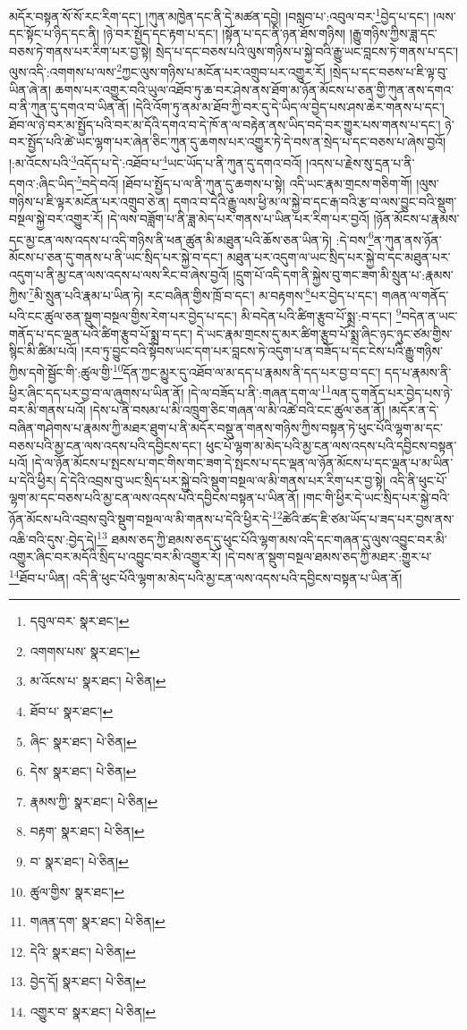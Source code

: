མདོར་བསྟན་སོ་སོ་རང་རིག་དང་། །ཀུན་མཁྱེན་དང་ནི་དེ་མཚན་དབྱེ། །བསླབ་པ་:འབུལ་བར་\footnote{དབུལ་བར་  སྣར་ཐང་། }བྱེད་པ་དང་། །ལས་དང་སྟོང་པ་ཉིད་དང་ནི། །ཉེ་བར་སྤྱོད་དང་རྟག་པ་དང་། །སྟོན་པ་དང་ནི་ཉན་ཐོས་གཉིས། །རྒྱུ་གཉིས་ཀྱིས་ཟླ་དང་བཅས་ཏེ་གནས་པར་རིག་པར་བྱ་སྟེ། སྲེད་པ་དང་བཅས་པའི་ལུས་གཉིས་པ་སྐྱེ་བའི་རྒྱུ་ཡང་བླངས་ཏེ་གནས་པ་དང་། ལུས་འདི་:འགགས་པ་ལས་\footnote{འགགས་པས་  སྣར་ཐང་། }ཀྱང་ལུས་གཉིས་པ་མངོན་པར་འགྲུབ་པར་འགྱུར་རོ། །སྲེད་པ་དང་བཅས་པ་ཇི་ལྟ་བུ་ཡིན་ཞེ་ན། ཆགས་པར་འགྱུར་བའི་ཡུལ་འཐོབ་ཏུ་ཆ་བར་ཤེས་ནས་ཐོག་མ་ཉོན་མོངས་པ་ཅན་གྱི་ཀུན་ནས་དགའ་བ་ནི་ཀུན་དུ་དགའ་བ་ཡིན་ནོ། །དེའི་འོག་ཏུ་ནམ་མ་ཐོབ་ཀྱི་བར་དུ་དེ་ཡིད་ལ་བྱེད་པས་ཤས་ཆེར་གནས་པ་དང་། ཐོབ་ལ་ཉེ་བར་མ་སྤྱོད་པའི་བར་མ་དོའི་དགའ་བ་དེ་ཁོ་ན་ལ་བརྟེན་ནས་ཡིད་བདེ་བར་གྱུར་པས་གནས་པ་དང་། ཉེ་བར་སྤྱོད་པའི་ཚེ་ཡང་ལྷག་པར་ཞེན་ཅིང་ཀུན་དུ་ཆགས་པར་འགྱུར་ཏེ་དེ་བས་ན་སྲེད་པ་དང་བཅས་པ་ཞེས་བྱའོ། །:མ་འོངས་པའི་\footnote{མ་འོངས་པ་  སྣར་ཐང་།  པེ་ཅིན། }འདོད་པ་དེ་:འཐོབ་པ་\footnote{ཐོབ་པ་  སྣར་ཐང་། }ཡང་ཡོད་པ་ནི་ཀུན་དུ་དགའ་བའོ། །འདས་པ་རྗེས་སུ་དྲན་པ་ནི་དགའ་:ཞིང་ཡིད་\footnote{ཞིང་  སྣར་ཐང་།  པེ་ཅིན། }བདེ་བའོ། །ཐོབ་པ་སྤྱོད་པ་ལ་ནི་ཀུན་དུ་ཆགས་པ་སྟེ། འདི་ཡང་རྣམ་གྲངས་གཅིག་གོ། །ལུས་གཉིས་པ་ཇི་ལྟར་མངོན་པར་འགྲུབ་ཅེ་ན། དགའ་བ་དེའི་རྒྱུ་ལས་ཕྱི་མ་ལ་སྐྱེ་བ་དང་རྒ་བའི་རྩ་བ་ལས་བྱུང་བའི་སྡུག་བསྔལ་སྐྱེ་བར་འགྱུར་རོ། །དེ་ལས་བཟློག་པ་ནི་ཟླ་མེད་པར་གནས་པ་ཡིན་པར་རིག་པར་བྱའོ། །ཉོན་མོངས་པ་རྣམས་དང་མྱ་ངན་ལས་འདས་པ་འདི་གཉིས་ནི་ཕན་ཚུན་མི་མཐུན་པའི་ཆོས་ཅན་ཡིན་ཏེ། :དེ་བས་\footnote{དེས་  སྣར་ཐང་།  པེ་ཅིན། }ན་ཀུན་ནས་ཉོན་མོངས་པ་ཅན་དུ་གནས་པ་ནི་ཡང་སྲིད་པར་སྐྱེ་བ་དང་། མཐུན་པར་འདུག་ལ་ཡང་སྲིད་པར་སྐྱེ་བ་དང་མཐུན་པར་འདུག་པ་ནི་མྱ་ངན་ལས་འདས་པ་ལས་རིང་བ་ཞེས་བྱའོ། །དྲུག་པོ་འདི་དག་ནི་སྐྱེས་བུ་གང་ཟག་མི་སྲུན་པ་:རྣམས་ཀྱིས་\footnote{རྣམས་ཀྱི་  སྣར་ཐང་།  པེ་ཅིན། }མི་སྲུན་པའི་རྣམ་པ་ཡིན་ཏེ། རང་བཞིན་གྱིས་ཁྲོ་བ་དང་། མ་བརྟགས་\footnote{བརྟག་  སྣར་ཐང་།  པེ་ཅིན། }པར་བྱེད་པ་དང་། གཞན་ལ་གནོད་པའི་ངང་ཚུལ་ཅན་སྡུག་བསྔལ་གྱིས་རེག་པར་བྱེད་པ་དང་། མི་བདེན་པའི་ཚིག་རྩུབ་པོ་སྨྲ་:བ་དང་། \footnote{བ་  སྣར་ཐང་།  པེ་ཅིན། }བདེན་ན་ཡང་གནོད་པ་དང་ལྡན་པའི་ཚིག་རྩུབ་པོ་སྨྲ་བ་དང་། དེ་ཡང་རྣམ་གྲངས་དུ་མར་ཚིག་རྩུབ་པོ་སྨྲ་ཞིང་ཉང་ཉུང་ཙམ་གྱིས་སྙིང་མི་ཚིམ་པའོ། །རབ་ཏུ་བྱུང་བའི་སྟོབས་ཡང་དག་པར་བླངས་ཏེ་འདུག་པ་ན་བཟོད་པ་དང་ངེས་པའི་རྒྱུ་གཉིས་ཀྱིས་དགེ་སྦྱོང་གི་:ཚུལ་གྱི་\footnote{ཚུལ་གྱིས་  སྣར་ཐང་། }དོན་ཀྱང་མྱུར་དུ་འཐོབ་ལ་མ་དད་པ་རྣམས་ནི་དད་པར་བྱ་བ་དང་། དད་པ་རྣམས་ནི་ཕྱིར་ཞིང་དད་པར་བྱ་བ་ལ་ཞུགས་པ་ཡིན་ནོ། །དེ་ལ་བཟོད་པ་ནི་:གཞན་དག་ལ་\footnote{གཞན་དག་  སྣར་ཐང་།  པེ་ཅིན། }ལན་དུ་གནོད་པར་བྱེད་པས་ཉེ་བར་མི་གནས་པའོ། །དེས་པ་ནི་བསམ་པ་མི་འཁྲུག་ཅིང་གཞན་ལ་མི་འཚེ་བའི་ངང་ཚུལ་ཅན་ནོ། །མདོར་ན་དེ་བཞིན་གཤེགས་པ་རྣམས་ཀྱི་མཐར་ཐུག་པ་ནི་མདོར་བསྡུ་ན་གནས་གཉིས་ཀྱིས་བསྟན་ཏེ་ཕུང་པོའི་ལྷག་མ་དང་བཅས་པའི་མྱ་ངན་ལས་འདས་པའི་དབྱིངས་དང་། ཕུང་པོ་ལྷག་མ་མེད་པའི་མྱ་ངན་ལས་འདས་པའི་དབྱིངས་བསྟན་པའོ། །དེ་ལ་ཉོན་མོངས་པ་སྤངས་པ་གང་གིས་གང་ཟག་དེ་སྤངས་པ་དང་ལྡན་ལ་ཉོན་མོངས་པ་དང་ལྡན་པ་མ་ཡིན་པ་དེའི་ཕྱིར། དེ་དེའི་འབྲས་བུ་ཡང་སྲིད་པར་སྐྱེ་བའི་སྡུག་བསྔལ་ལ་མི་གནས་པར་རིག་པར་བྱ་སྟེ། འདི་ནི་ཕུང་པོ་ལྷག་མ་དང་བཅས་པའི་མྱ་ངན་ལས་འདས་པའི་དབྱིངས་བསྟན་པ་ཡིན་ནོ། །གང་གི་ཕྱིར་དེ་ཡང་སྲིད་པར་སྐྱེ་བའི་ཉོན་མོངས་པའི་འབྲས་བུའི་སྡུག་བསྔལ་ལ་མི་གནས་པ་དེའི་ཕྱིར་དེ་\footnote{དེའི་  སྣར་ཐང་།  པེ་ཅིན། }ཚེའི་ཚད་ཇི་ཙམ་ཡོད་པ་ཟད་པར་བྱས་ནས་འཆི་བའི་དུས་:བྱེད་དེ།\footnote{བྱེད་དོ།  སྣར་ཐང་།  པེ་ཅིན། } ཐམས་ཅད་ཀྱི་ཐམས་ཅད་དུ་ཕུང་པོའི་ལྷག་མས་འདི་དང་གཞན་དུ་ལུས་འབྱུང་བར་མི་འགྱུར་ཞིང་བར་མདོའི་སྲིད་པ་འབྱུང་བར་མི་འགྱུར་རོ། །དེ་བས་ན་སྡུག་བསྔལ་ཐམས་ཅད་ཀྱི་མཐར་:གྱུར་པ་\footnote{འགྱུར་བ་  སྣར་ཐང་།  པེ་ཅིན། }ཐོབ་པ་ཡིན། འདི་ནི་ཕུང་པོའི་ལྷག་མ་མེད་པའི་མྱ་ངན་ལས་འདས་པའི་དབྱིངས་བསྟན་པ་ཡིན་ནོ། 